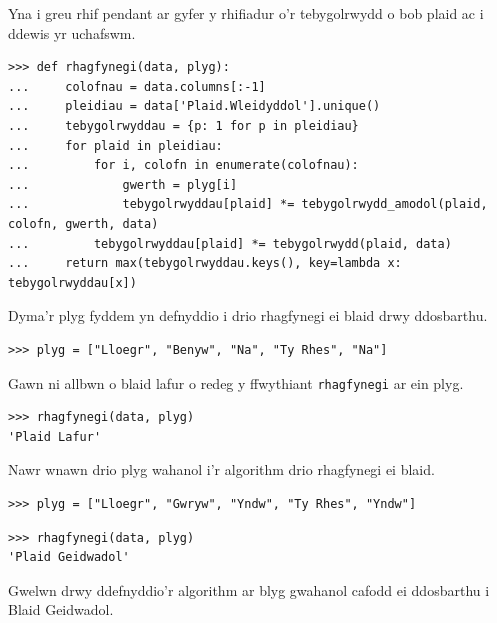 Yna i greu rhif pendant ar gyfer y rhifiadur o'r tebygolrwydd o bob plaid ac i ddewis yr uchafswm.

\begin{verbatim}
>>> def rhagfynegi(data, plyg):
...     colofnau = data.columns[:-1]
...     pleidiau = data['Plaid.Wleidyddol'].unique()
...     tebygolrwyddau = {p: 1 for p in pleidiau}
...     for plaid in pleidiau:
...         for i, colofn in enumerate(colofnau):
...             gwerth = plyg[i]
...             tebygolrwyddau[plaid] *= tebygolrwydd_amodol(plaid, colofn, gwerth, data)
...         tebygolrwyddau[plaid] *= tebygolrwydd(plaid, data)
...     return max(tebygolrwyddau.keys(), key=lambda x: tebygolrwyddau[x])
\end{verbatim}

Dyma'r plyg fyddem yn defnyddio i drio rhagfynegi ei blaid drwy ddosbarthu. 

\begin{verbatim}
>>> plyg = ["Lloegr", "Benyw", "Na", "Ty Rhes", "Na"]
\end{verbatim}

Gawn ni allbwn o blaid lafur o redeg y ffwythiant \texttt{rhagfynegi} ar ein plyg.

\begin{verbatim}
>>> rhagfynegi(data, plyg)
'Plaid Lafur'
\end{verbatim}

Nawr wnawn drio plyg wahanol i'r algorithm drio rhagfynegi ei blaid.

\begin{verbatim}
>>> plyg = ["Lloegr", "Gwryw", "Yndw", "Ty Rhes", "Yndw"]
\end{verbatim}

\begin{verbatim}
>>> rhagfynegi(data, plyg)
'Plaid Geidwadol'
\end{verbatim}

Gwelwn drwy ddefnyddio'r algorithm ar blyg gwahanol cafodd ei ddosbarthu i Blaid Geidwadol.